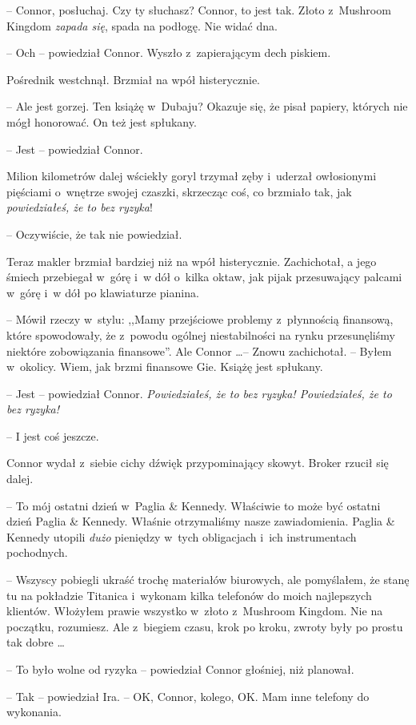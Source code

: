 \documentclass[oneside,polish,11pt,rmheadings]{mwbk}
\begin{document}
-- Connor, posłuchaj. Czy ty słuchasz? Connor, to jest tak. Złoto z~Mushroom Kingdom \textit{zapada się}, spada na podłogę. Nie widać dna.

-- Och -- powiedział Connor. Wyszło z~zapierającym dech piskiem.

Pośrednik westchnął. Brzmiał na wpół histerycznie. 

-- Ale jest gorzej. Ten książę w~Dubaju? Okazuje się, że pisał papiery, których nie mógł honorować. On też jest spłukany.

-- Jest -- powiedział Connor.

 Milion kilometrów dalej wściekły goryl trzymał zęby i~uderzał owłosionymi pięściami o~wnętrze swojej czaszki, skrzecząc coś, co brzmiało tak, jak \textit{powiedziałeś, że to bez ryzyka}! 

-- Oczywiście, że tak nie powiedział. 

 Teraz makler brzmiał bardziej niż na wpół histerycznie. Zachichotał, a jego śmiech przebiegał w~górę i~w dół o~kilka oktaw, jak pijak przesuwający palcami w~górę i~w dół po klawiaturze pianina. 
 
 -- Mówił rzeczy w~stylu: ,,Mamy przejściowe problemy z~płynnością finansową, które spowodowały, że z~powodu ogólnej niestabilności na rynku przesunęliśmy niektóre zobowiązania finansowe''. Ale Connor \ldots  -- Znowu zachichotał. -- Byłem w~okolicy. Wiem, jak brzmi finansowe Gie. Książę jest spłukany.

-- Jest -- powiedział Connor. \textit{Powiedziałeś, że to bez ryzyka! Powiedziałeś, że to bez ryzyka!}

-- I jest coś jeszcze.

Connor wydał z~siebie cichy dźwięk przypominający skowyt. Broker rzucił się dalej. 

-- To mój ostatni dzień w~Paglia \& Kennedy. Właściwie to może być ostatni dzień Paglia \& Kennedy. Właśnie otrzymaliśmy nasze zawiadomienia. Paglia \& Kennedy utopili \textit{dużo }pieniędzy w~tych obligacjach i~ich instrumentach pochodnych.

-- Wszyscy pobiegli ukraść trochę materiałów biurowych, ale pomyślałem, że stanę tu na pokładzie Titanica i~wykonam kilka telefonów do moich najlepszych klientów. Włożyłem prawie wszystko w~złoto z~Mushroom Kingdom. Nie na początku, rozumiesz. Ale z~biegiem czasu, krok po kroku, zwroty były po prostu tak dobre \ldots 

-- To było wolne od ryzyka -- powiedział Connor głośniej, niż planował.

-- Tak -- powiedział Ira. -- OK, Connor, kolego, OK. Mam inne telefony do wykonania. 
\end{document}
